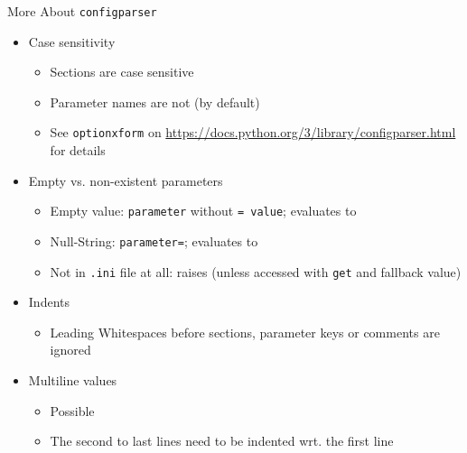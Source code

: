 \begin{frame}{More About \texttt{configparser}}
%
\begin{itemize}
\item Case sensitivity
	\begin{itemize}
	\item Sections are case sensitive
	\item Parameter names are not (by default)
	\item See \texttt{optionxform} on \url{https://docs.python.org/3/library/configparser.html} for details
	\end{itemize}
\item Empty vs. non-existent parameters
	\begin{itemize}
	\item Empty value: \texttt{parameter} without \texttt{= value}; evaluates to 
	\item Null-String: \texttt{parameter=}; evaluates to 
	\item Not in \texttt{.ini} file at all: raises  (unless accessed with \texttt{get} and fallback value)
	\end{itemize}
\item Indents
	\begin{itemize}
	\item Leading Whitespaces before sections, parameter keys or comments are ignored
	\end{itemize}
\item Multiline values
	\begin{itemize}
	\item Possible
	\item The second to last lines need to be indented wrt. the first line
	\end{itemize}
\end{itemize}
%
\end{frame}


